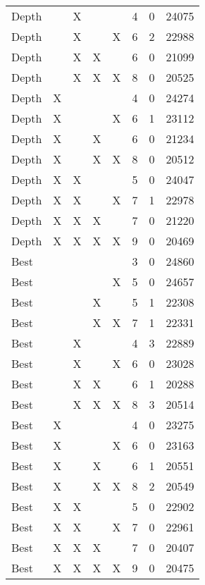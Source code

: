\begin{tabular}{lllllrrr}
      Depth &    &  X &    &    &        4 &       0 &      24075 \\
      Depth &    &  X &    &  X &        6 &       2 &      22988 \\
      Depth &    &  X &  X &    &        6 &       0 &      21099 \\
      Depth &    &  X &  X &  X &        8 &       0 &      20525 \\
      Depth &  X &    &    &    &        4 &       0 &      24274 \\
      Depth &  X &    &    &  X &        6 &       1 &      23112 \\
      Depth &  X &    &  X &    &        6 &       0 &      21234 \\
      Depth &  X &    &  X &  X &        8 &       0 &      20512 \\
      Depth &  X &  X &    &    &        5 &       0 &      24047 \\
      Depth &  X &  X &    &  X &        7 &       1 &      22978 \\
      Depth &  X &  X &  X &    &        7 &       0 &      21220 \\
      Depth &  X &  X &  X &  X &        9 &       0 &      20469 \\
       Best &    &    &    &    &        3 &       0 &      24860 \\
       Best &    &    &    &  X &        5 &       0 &      24657 \\
       Best &    &    &  X &    &        5 &       1 &      22308 \\
       Best &    &    &  X &  X &        7 &       1 &      22331 \\
       Best &    &  X &    &    &        4 &       3 &      22889 \\
       Best &    &  X &    &  X &        6 &       0 &      23028 \\
       Best &    &  X &  X &    &        6 &       1 &      20288 \\
       Best &    &  X &  X &  X &        8 &       3 &      20514 \\
       Best &  X &    &    &    &        4 &       0 &      23275 \\
       Best &  X &    &    &  X &        6 &       0 &      23163 \\
       Best &  X &    &  X &    &        6 &       1 &      20551 \\
       Best &  X &    &  X &  X &        8 &       2 &      20549 \\
       Best &  X &  X &    &    &        5 &       0 &      22902 \\
       Best &  X &  X &    &  X &        7 &       0 &      22961 \\
       Best &  X &  X &  X &    &        7 &       0 &      20407 \\
       Best &  X &  X &  X &  X &        9 &       0 &      20475 \\
\bottomrule
\end{tabular}
\unskip